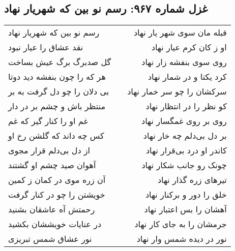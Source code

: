 \begin{center}
\section*{غزل شماره ۹۶۷: رسم نو بین که شهریار نهاد}
\label{sec:0967}
\begin{longtable}{l p{0.5cm} r}
رسم نو بین که شهریار نهاد
&&
قبله مان سوی شهر یار نهاد
\\
نقد عشاق را عیار نبود
&&
او ز کان کرم عیار نهاد
\\
گل صدبرگ برگ عیش بساخت
&&
روی سوی بنفشه زار نهاد
\\
هر که را چون بنفشه دید دوتا
&&
کرد یکتا و در شمار نهاد
\\
بی دلان را چو دل گرفت به بر
&&
سرکشان را چو سر خمار نهاد
\\
منتظر باش و چشم بر در دار
&&
کو نظر را در انتظار نهاد
\\
غم او را کنار گیر که غم
&&
روی بر روی غمگسار نهاد
\\
کس چه داند که گلشن رخ او
&&
بر دل بی‌دلم چه خار نهاد
\\
از دل بی‌دلم قرار مجوی
&&
کاندر او درد بی‌قرار نهاد
\\
آهوان صید چشم او گشتند
&&
چونک رو جانب شکار نهاد
\\
آن زره موی در کمان ز کمین
&&
تیرهای زره گذار نهاد
\\
خویشتن را چو در کنار گرفت
&&
خلق را دور و برکنار نهاد
\\
رحمتش آه عاشقان بشنید
&&
آهشان را بس اعتبار نهاد
\\
در عنایات خویششان بکشید
&&
جرمشان را به جای کار نهاد
\\
نور عشاق شمس تبریزی
&&
نور در دیده شمس وار نهاد
\\
\end{longtable}
\end{center}
